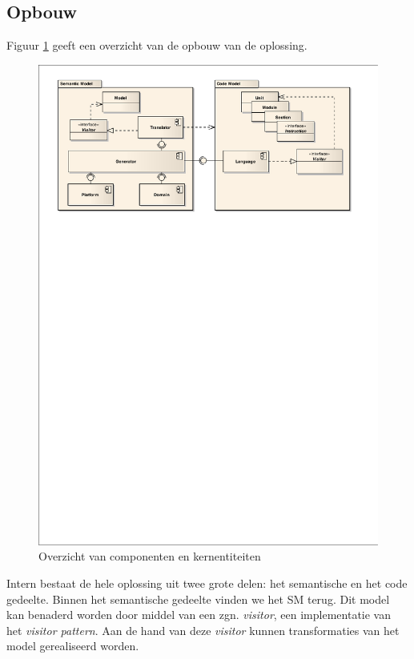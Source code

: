
\subsection{Opbouw}

Figuur \ref{fig:devel-component-overview} geeft een overzicht van de opbouw van
de oplossing.

\begin{figure}[ht]
  \centering
  \includegraphics[width=\linewidth]{resources/component-overview.pdf}
  \caption{Overzicht van componenten en kernentiteiten}
  \label{fig:devel-component-overview}
\end{figure}

Intern bestaat de hele oplossing uit twee grote delen: het semantische en het
code gedeelte. Binnen het semantische gedeelte vinden we het SM terug. Dit
model kan benaderd worden door middel van een zgn. \emph{visitor}, een
implementatie van het \emph{visitor pattern}. Aan de hand van deze
\emph{visitor} kunnen transformaties van het model gerealiseerd worden.

